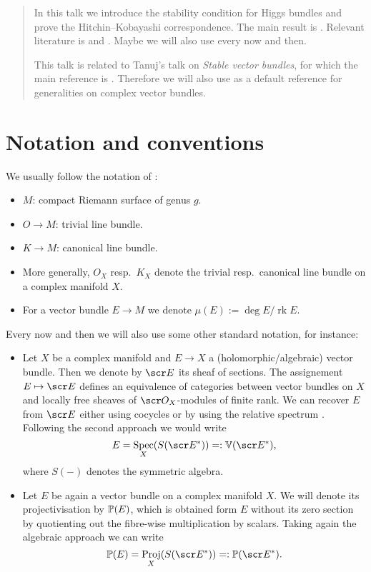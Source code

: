 \documentclass[A4paper, 12pt, british, reqno]{amsart}
\DeclareMathOperator{\Spec}{Spec}
\DeclareMathOperator{\Proj}{Proj}
\DeclareMathOperator{\rk}{rk}
\newcommand{\dual}{^{*}}
\begin{document}
\maketitle

\begin{abstract}
    In this talk we introduce the stability condition for Higgs bundles and prove the Hitchin--Kobayashi correspondence.
    The main result is \cite[Theorem 4.3]{hit87a}.
    Relevant literature is \cite[\S 3 and \S 4]{hit87a} and \cite[\S 2 and \S 3]{wen14}.
    Maybe we will also use \cite{wen16} every now and then.

    This talk is related to Tanuj's talk on \textit{Stable vector bundles}, for which the main reference is \cite{kob87}.
    Therefore we will also use \cite{kob87} as a default reference for generalities on complex vector bundles.
\end{abstract}

\tableofcontents

\section*{Notation and conventions}

We usually follow the notation of \cite{hit87a}:
\begin{itemize}
    \item $M$: compact Riemann surface of genus $g$.
    \item $O\to M$: trivial line bundle.
    \item $K\to M$: canonical line bundle.
    \item More generally, $O_{X}$ resp.~$K_{X}$ denote the trivial resp.~canonical line bundle on a complex manifold $X$.
    \item For a vector bundle $E\to M$ we denote $\mu(E):=\deg{E}/\rk{E}$.
\end{itemize}
Every now and then we will also use some other standard notation, for instance:
\begin{itemize}
    \item Let $X$ be a complex manifold and $E\to X$ a (holomorphic/algebraic) vector bundle.
	Then we denote by $\E$ its sheaf of sections.
	The assignement $E\mapsto \E$ defines an equivalence of categories between vector bundles on $X$ and locally free sheaves of $\O_{X}$-modules of finite rank.
	We can recover $E$ from $\E$ either using cocycles \cite[Lemma 4.8]{voi02} or by using the relative spectrum \cite[Exercise II.5.18]{har77}.
	Following the second approach we would write
	\[ E=\Spec_{X}(S(\E\dual))=:\V(\E\dual), \]
	where $S(-)$ denotes the symmetric algebra.
    \item Let $E$ be again a vector bundle on a complex manifold $X$.
	We will denote its projectivisation by $\P(E)$, which is obtained form $E$ without its zero section by quotienting out the fibre-wise multiplication by scalars.
	Taking again the algebraic approach we can write
	\[ \P(E)=\Proj_{X}(S(\E\dual))=:\P(\E\dual). \]
\end{itemize}
\end{document}
